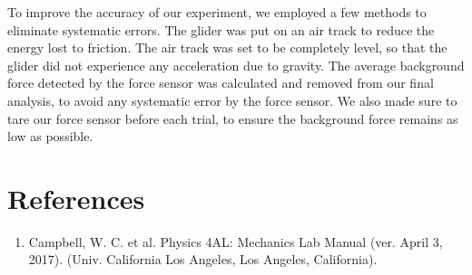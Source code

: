 \documentclass[11pt]{report}
\begin{document}
To improve the accuracy of our experiment, we employed a few methods to
eliminate systematic errors.  The glider was put on an air track to reduce the
energy lost to friction.  The air track was set to be completely level, so that
the glider did not experience any acceleration due to gravity.  The average
background force detected by the force sensor was calculated and removed from
our final analysis, to avoid any systematic error by the force sensor.  
We also made sure to tare our force sensor before each trial, to ensure the 
background force remains as low as possible.  




\newpage
\section*{References}
\begin{enumerate}
    \item Campbell, W. C. et al. Physics 4AL: Mechanics Lab Manual (ver. April
        3, 2017). (Univ. California Los Angeles, Los Angeles, California).
\end{enumerate}
\end{document}
